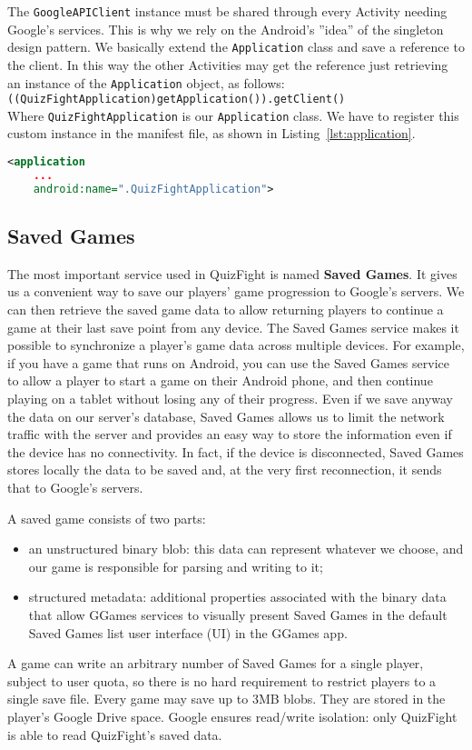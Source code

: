 The \texttt{GoogleAPIClient} instance must be shared through every Activity needing Google's services. This is why we rely on the Android's ''idea'' of the singleton design pattern. We basically extend the \texttt{Application} class and save a reference to the client. In this way the other Activities may get the reference just retrieving an instance of the \texttt{Application} object, as follows: \\
\texttt{((QuizFightApplication)getApplication()).getClient()} \\
Where \texttt{QuizFightApplication} is our \texttt{Application} class. We have to register this custom instance in the manifest file, as shown in Listing~\ref{lst:application}.
\begin{lstlisting}[language=xml, caption={Application declaration}, label={lst:application}]
<application
	...
	android:name=".QuizFightApplication">
\end{lstlisting}

\subsection{Saved Games}
The most important service used in QuizFight is named \textbf{Saved Games}. It gives us a convenient way to save our players' game progression to Google's servers. We can then retrieve the saved game data to allow returning players to continue a game at their last save point from any device. The Saved Games service makes it possible to synchronize a player's game data across multiple devices. For example, if you have a game that runs on Android, you can use the Saved Games service to allow a player to start a game on their Android phone, and then continue playing on a tablet without losing any of their progress. Even if we save anyway the data on our server's database, Saved Games allows us to limit the network traffic with the server and provides an easy way to store the information even if the device has no connectivity. In fact, if the device is disconnected, Saved Games stores locally the data to be saved and, at the very first reconnection, it sends that to Google's servers.

A saved game consists of two parts:
\begin{itemize}
	\item an unstructured binary blob: this data can represent whatever we choose, and our game is responsible for parsing and writing to it;
	\item structured metadata: additional properties associated with the binary data that allow GGames services to visually present Saved Games in the default Saved Games list user interface (UI) in the GGames app.
\end{itemize}
A game can write an arbitrary number of Saved Games for a single player, subject to user quota, so there is no hard requirement to restrict players to a single save file. Every game may save up to 3MB blobs. They are stored in the player's Google Drive space. Google ensures read/write isolation: only QuizFight is able to read QuizFight's saved data.

